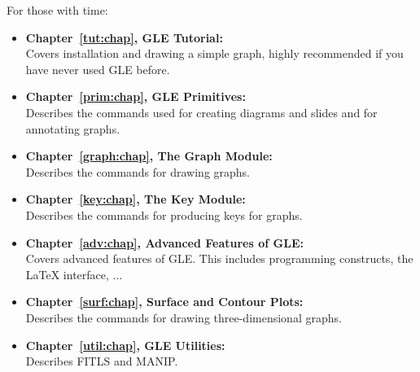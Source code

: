 For those with time:
\begin{itemize}	
 \item {\bf Chapter~\ref{tut:chap}, GLE Tutorial:}\\
	Covers installation and drawing a simple graph, highly
	recommended if you have never used GLE before.
 \item {\bf Chapter~\ref{prim:chap}, GLE Primitives:}\\
	Describes the commands used for creating diagrams and slides and for annotating graphs.
 \item {\bf Chapter~\ref{graph:chap}, The Graph Module:}\\
	Describes the commands for drawing graphs.
 \item {\bf Chapter~\ref{key:chap}, The Key Module:}\\
	Describes the commands for producing keys for graphs.
 \item {\bf Chapter~\ref{adv:chap}, Advanced Features of GLE:}\\
	Covers advanced features of GLE. This includes programming constructs,
	the \LaTeX{} interface, $\ldots$
 \item {\bf Chapter~\ref{surf:chap}, Surface and Contour Plots:}\\
	Describes the commands for drawing three-dimensional graphs.
 \item {\bf Chapter~\ref{util:chap}, GLE Utilities:}\\
	Describes FITLS and MANIP.
\end{itemize}

